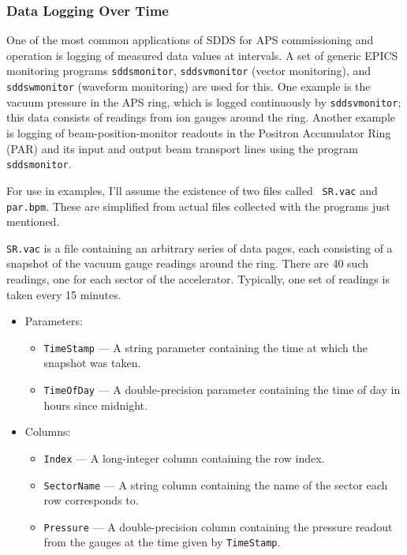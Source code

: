 \documentclass[11pt]{article}
\begin{document}
\subsubsection{Data Logging Over Time}

One of the most common applications of SDDS for APS commissioning and
operation is logging of measured data values at intervals.  A set of
generic EPICS monitoring programs {\tt sddsmonitor}, {\tt sddsvmonitor}
(vector monitoring), and {\tt sddswmonitor} (waveform monitoring) are used
for this.  One example is the vacuum pressure in the APS ring, which is
logged continuously by {\tt sddsvmonitor}; this data consists of readings
from ion gauges around the ring.  Another example is logging of
beam-position-monitor readouts in the Positron Accumulator Ring (PAR) and
its input and output beam transport lines using the program {\tt
sddsmonitor}.

For use in examples, I'll assume the existence of two files called {\tt
SR.vac} and {\tt par.bpm}.  These are simplified from actual files
collected with the programs just mentioned.
 
{\tt SR.vac} is a file containing an arbitrary series of data pages, each
consisting of a snapshot of the vacuum gauge readings around the ring.
There are 40 such readings, one for each sector of the accelerator.
Typically, one set of readings is taken every 15 minutes.
\begin{itemize}
\item Parameters:
        \begin{itemize}
        \item {\tt TimeStamp} --- A string parameter containing the time at which the snapshot was taken.
        \item {\tt TimeOfDay} --- A double-precision parameter containing the time of day in hours since midnight.
        \end{itemize}
\item Columns:
        \begin{itemize}
        \item {\tt Index} --- A long-integer column containing the row index.
        \item {\tt SectorName} --- A string column containing the name of the sector each row corresponds to.
        \item {\tt Pressure} --- A double-precision column containing the pressure readout from the gauges at
                the time given by {\tt TimeStamp}.
        \end{itemize}
\end{itemize}
\end{document}
